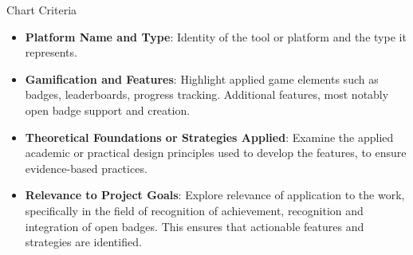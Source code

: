 Chart Criteria
\begin{itemize}
    \item \textbf{Platform Name and Type}:  Identity of the tool or platform and the type it represents.
    \item \textbf{Gamification and Features}:  Highlight applied game elements such as badges, leaderboards, progress tracking. Additional features, most notably open badge support and creation.
    \item \textbf{Theoretical Foundations or Strategies Applied}:  Examine the applied academic or practical design principles used to develop the features, to ensure evidence-based practices.
    \item \textbf{Relevance to Project Goals}: Explore relevance of application to the work, specifically in the field of recognition of achievement, recognition and integration of open badges. This ensures that actionable features and strategies are identified.
\end{itemize}


